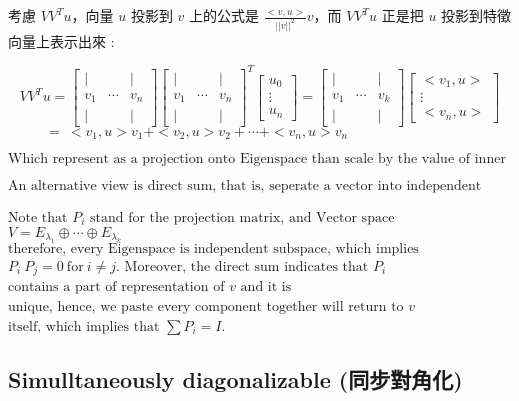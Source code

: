 \documentclass[
]{book}
\begin{document}
考慮 \(V V^Tu\)，向量 \(u\) 投影到 \(v\) 上的公式是 \(\frac{<v,u>}{||v||^2}v\)，而 \(VV^Tu\) 正是把 \(u\) 投影到特徵向量上表示出來 :

\[
VV^Tu = \begin{bmatrix}
\mid & & \mid \\
v_1 & \cdots & v_n \\
\mid & & \mid
\end{bmatrix}\begin{bmatrix}
\mid & & \mid \\
v_1 & \cdots & v_n \\
\mid & & \mid
\end{bmatrix}^T\begin{bmatrix}
u_0\\
\vdots\\
u_n
\end{bmatrix} = \begin{bmatrix}
\mid & & \mid \\
v_1 & \cdots & v_k \\
\mid & & \mid
\end{bmatrix}\begin{bmatrix}
<v_1,u>\\
\vdots\\
<v_n,u>
\end{bmatrix}
\]
\(\ \ \ \ \ \ \ \ \ \ \ \ = \ <v_1,u>v_1 + <v_2,u>v_2 + \cdots + <v_n,u>v_n\)

\(\mbox{Which represent as a projection onto Eigenspace than scale by the value of inner product.}\)

\(\mbox{An alternative view is direct sum, that is, seperate a vector into independent Eigen subspace.}\)

\(\mbox{Note that}\) \(P_i\) \(\mbox{stand for the projection matrix, and Vector space}\) \(V = E_{\lambda_1}\oplus\cdots\oplus E_{\lambda_k}\) \(\mbox{therefore, every Eigenspace is independent subspace, which implies}\) \(P_i \ P_j = 0 \ \mbox{for} \ i \neq j.\)
\(\mbox{Moreover, the direct sum indicates that}\) \(P_i\) \(\mbox{contains a part of representation of}\) \(v\) \(\mbox{and it is}\)
\(\mbox{unique, hence, we paste every component together will return to}\) \(v\) \(\mbox{itself, which implies that}\) \(\sum P_i = I.\)

\hypertarget{simulltaneously-diagonalizable-ux540cux6b65ux5c0dux89d2ux5316}{%
\subsection{Simulltaneously diagonalizable (同步對角化)}\label{simulltaneously-diagonalizable-ux540cux6b65ux5c0dux89d2ux5316}}
\end{document}

